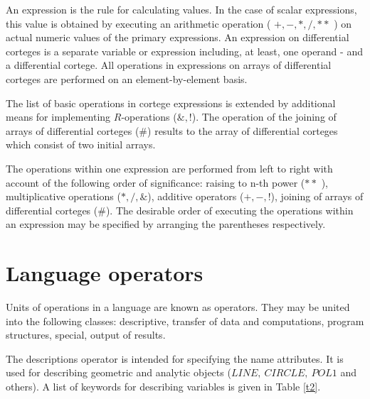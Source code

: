 An expression is the rule for calculating values. In the case of scalar
expressions, this value is obtained by executing an arithmetic operation ( $%
+,-,*,/,**$ ) on actual numeric values of the primary expressions. An
expression on differential corteges is a separate variable or expression
including, at least, one operand - and a differential cortege. All
operations in expressions on arrays of differential corteges are performed
on an element-by-element basis.

The list of basic operations in cortege expressions is extended by
additional means for implementing $R$-operations ($\&,!$). The operation of
the joining of arrays of differential corteges ($\#$) results to the array
of differential corteges which consist of two initial arrays.

The operations within one expression are performed from left to right with
account of the following order of significance: raising to n-th power ($**$%
), multiplicative operations ($*,/,\&$), additive operators ($+,-,!$),
joining of arrays of differential corteges ($\#$). The desirable order of
executing the operations within an expression may be specified by arranging
the parentheses respectively.

\section{ Language operators}

Units of operations in a language are known as operators. They may be united
into the following classes: descriptive, transfer of data and computations,
program structures, special, output of results.

The descriptions operator is intended for specifying the name attributes. It
is used for describing geometric and analytic objects ($LINE,\ CIRCLE,\ POL1$
and others). A list of keywords for describing variables is given in Table 
\ref{t2}.

